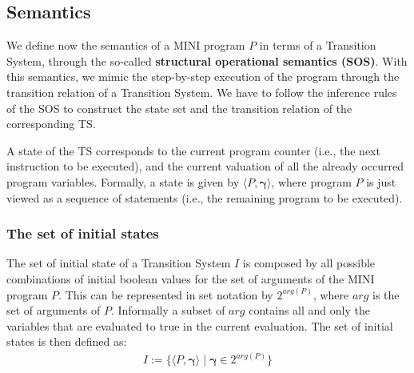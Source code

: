 \documentclass{article}
\begin{document}
\subsection{Semantics}
We define now the semantics of a MINI program $P$ in terms of a Transition System, through the so-called \textbf{structural operational semantics (SOS)}. With this semantics, we mimic the step-by-step execution of the program through the transition relation of a Transition System. We have to follow the inference rules of the SOS to construct the state set and the transition relation of the corresponding TS.

A state of the TS corresponds to the current program counter (i.e., the next instruction to be executed), and the current valuation of all the already occurred program variables.
Formally, a state is given by $\langle P, \mathbf{\gamma} \rangle$, where program $P$ is just viewed as a sequence of statements (i.e., the remaining program to be executed). 

\subsubsection{The set of initial states}
The set of initial state of a Transition System $I$ is composed by all possible combinations of initial boolean values for the set of arguments of the MINI program $P$. This can be represented in set notation by $2^{arg(P)}$, where $arg$ is the set of arguments of $P$. Informally a subset of $arg$ contains all and only the variables that are evaluated to true in the current evaluation. The set of initial states is then defined as:
\begin{align*}
    I := \{ \langle P, \mathbf{\gamma} \rangle \mid \mathbf{\gamma} \in 2^{arg(P)} \}
\end{align*}
\end{document}
